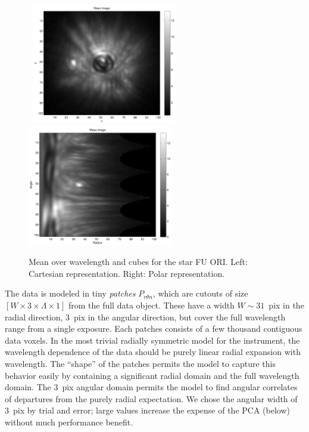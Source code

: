 \documentclass[12pt,pdftex,preprint]{aastex}
\begin{document}
\begin{figure}[h!]
\begin{center}
\mbox{
\includegraphics[width=2.5in]{figs/mean_xy.pdf}
\includegraphics[width=2.5in]{figs/mean_rt.pdf}
}
\end{center}
\vspace{-7mm}
\caption{Mean over wavelength and cubes for the star
 FU ORI. Left:
  Cartesian representation. Right: Polar representation.}
\label{fig:mean}
\end{figure}
 

The data is modeled in tiny \emph{patches} $P_{r \theta n}$, which are
cutouts of size $[W\times 3\times\Lambda\times 1]$ from the full data
object.  These have a width $W\sim 31$~pix in the radial direction,
3~pix in the angular direction, but cover the full wavelength range
from a single exposure.  Each patches consists of a few thousand
contiguous data voxels.  In the most trivial radially symmetric model
for the instrument, the wavelength dependence of the data should be
purely linear radial expansion with wavelength.  The ``shape'' of the
patches permits the model to capture this behavior easily by
containing a significant radial domain and the full wavelength domain.
The 3~pix angular domain permits the model to find angular correlates
of departures from the purely radial expectation.  We chose the
angular width of 3~pix by trial and error; large values increase the
expense of the PCA (below) without much performance benefit.
\end{document}
